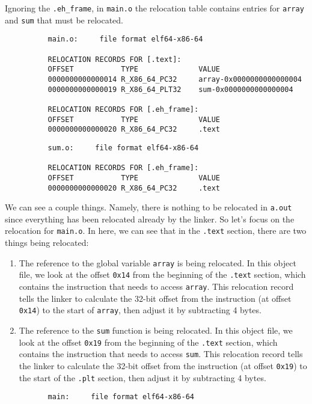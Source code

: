      \begin{example}
        Ignoring the \texttt{.eh\_frame}, in \texttt{main.o} the relocation table contains entries for \texttt{array} and \texttt{sum} that must be relocated. 
        \begin{lstlisting}
          main.o:     file format elf64-x86-64

          RELOCATION RECORDS FOR [.text]:
          OFFSET           TYPE              VALUE 
          0000000000000014 R_X86_64_PC32     array-0x0000000000000004
          0000000000000019 R_X86_64_PLT32    sum-0x0000000000000004

          RELOCATION RECORDS FOR [.eh_frame]:
          OFFSET           TYPE              VALUE 
          0000000000000020 R_X86_64_PC32     .text 
        \end{lstlisting}
        \begin{lstlisting}
          sum.o:     file format elf64-x86-64

          RELOCATION RECORDS FOR [.eh_frame]:
          OFFSET           TYPE              VALUE 
          0000000000000020 R_X86_64_PC32     .text
        \end{lstlisting}
        We can see a couple things. Namely, there is nothing to be relocated in \texttt{a.out} since everything has been relocated already by the linker. So let's focus on the relocation for \texttt{main.o}. In here, we can see that in the \texttt{.text} section, there are two things being relocated: 
        \begin{enumerate}
          \item The reference to the global variable \texttt{array} is being relocated. In this object file, we look at the offset \texttt{0x14} from the beginning of the \texttt{.text} section, which contains the instruction that needs to access \texttt{array}. This relocation record tells the linker to calculate the 32-bit offset from the instruction (at offset \texttt{0x14}) to the start of \texttt{array}, then adjust it by subtracting 4 bytes. 

          \item The reference to the \texttt{sum} function is being relocated. In this object file, we look at the offset \texttt{0x19} from the beginning of the \texttt{.text} section, which contains the instruction that needs to access \texttt{sum}. This relocation record tells the linker to calculate the 32-bit offset from the instruction (at offset \texttt{0x19}) to the start of the \texttt{.plt} section, then adjust it by subtracting 4 bytes.
        \end{enumerate}
        \begin{lstlisting}
          main:     file format elf64-x86-64 
        \end{lstlisting}
      \end{example}
       
